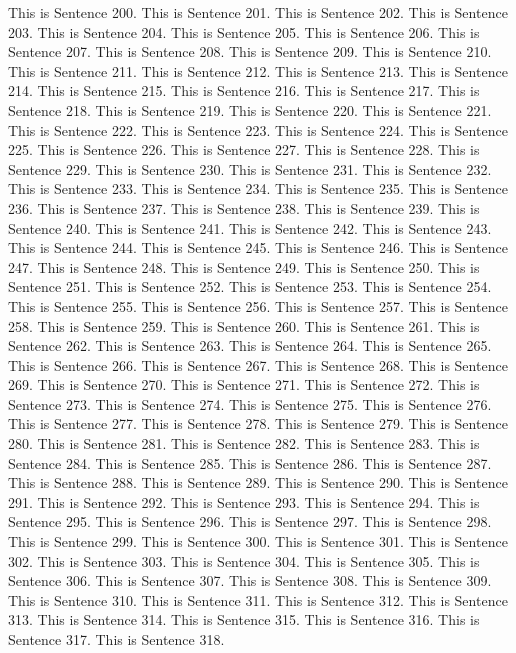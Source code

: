 \documentclass{article}
\begin{document}
This is Sentence 200.
This is Sentence 201.
This is Sentence 202.
This is Sentence 203.
This is Sentence 204.
This is Sentence 205.
This is Sentence 206.
This is Sentence 207.
This is Sentence 208.
This is Sentence 209.
This is Sentence 210.
This is Sentence 211.
This is Sentence 212.
This is Sentence 213.
This is Sentence 214.
This is Sentence 215.
This is Sentence 216.
This is Sentence 217.
This is Sentence 218.
This is Sentence 219.
This is Sentence 220.
This is Sentence 221.
This is Sentence 222.
This is Sentence 223.
This is Sentence 224.
This is Sentence 225.
This is Sentence 226.
This is Sentence 227.
This is Sentence 228.
This is Sentence 229.
This is Sentence 230.
This is Sentence 231.
This is Sentence 232.
This is Sentence 233.
This is Sentence 234.
This is Sentence 235.
This is Sentence 236.
This is Sentence 237.
This is Sentence 238.
This is Sentence 239.
This is Sentence 240.
This is Sentence 241.
This is Sentence 242.
This is Sentence 243.
This is Sentence 244.
This is Sentence 245.
This is Sentence 246.
This is Sentence 247.
This is Sentence 248.
This is Sentence 249.
This is Sentence 250.
This is Sentence 251.
This is Sentence 252.
This is Sentence 253.
This is Sentence 254.
This is Sentence 255.
This is Sentence 256.
This is Sentence 257.
This is Sentence 258.
This is Sentence 259.
This is Sentence 260.
This is Sentence 261.
This is Sentence 262.
This is Sentence 263.
This is Sentence 264.
This is Sentence 265.
This is Sentence 266.
This is Sentence 267.
This is Sentence 268.
This is Sentence 269.
This is Sentence 270.
This is Sentence 271.
This is Sentence 272.
This is Sentence 273.
This is Sentence 274.
This is Sentence 275.
This is Sentence 276.
This is Sentence 277.
This is Sentence 278.
This is Sentence 279.
This is Sentence 280.
This is Sentence 281.
This is Sentence 282.
This is Sentence 283.
This is Sentence 284.
This is Sentence 285.
This is Sentence 286.
This is Sentence 287.
This is Sentence 288.
This is Sentence 289.
This is Sentence 290.
This is Sentence 291.
This is Sentence 292.
This is Sentence 293.
This is Sentence 294.
This is Sentence 295.
This is Sentence 296.
This is Sentence 297.
This is Sentence 298.
This is Sentence 299.
This is Sentence 300.
This is Sentence 301.
This is Sentence 302.
This is Sentence 303.
This is Sentence 304.
This is Sentence 305.
This is Sentence 306.
This is Sentence 307.
This is Sentence 308.
This is Sentence 309.
This is Sentence 310.
This is Sentence 311.
This is Sentence 312.
This is Sentence 313.
This is Sentence 314.
This is Sentence 315.
This is Sentence 316.
This is Sentence 317.
This is Sentence 318.
\end{document}
